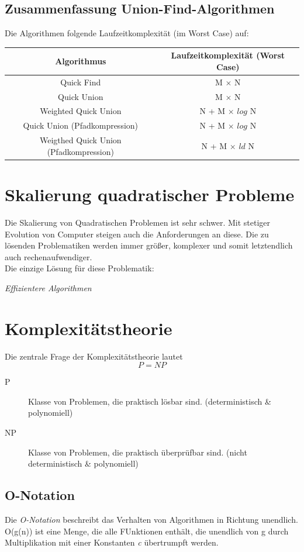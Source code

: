 \documentclass{book}
\begin{document}
\subsection{Zusammenfassung Union-Find-Algorithmen}
Die Algorithmen folgende Laufzeitkomplexität (im Worst Case) auf:
\begin{center}
\begin{tabular}{|c|c|}
	\hline
	\textbf{Algorithmus} & \textbf{Laufzeitkomplexität (Worst Case)} \\
	\hline
	Quick Find & M $\times$ N \\
	Quick Union & M $\times$ N \\
	Weighted Quick Union & N + M $\times$ $log$ N \\
	Quick Union (Pfadkompression) & N + M $\times$ $log$ N \\
	Weigthed Quick Union (Pfadkompression) & N + M $\times$ $ld$ N \\
	\hline
\end{tabular}
\end{center}
\section{Skalierung quadratischer Probleme}
Die Skalierung von Quadratischen Problemen ist sehr schwer. 
Mit stetiger Evolution von Computer steigen auch die Anforderungen an diese.
Die zu lösenden Problematiken werden immer größer, komplexer und somit letztendlich auch rechenaufwendiger.\\
Die einzige Lösung für diese Problematik: 
\begin{center}
	\textit{Effizientere Algorithmen}
\end{center}
\section{Komplexitätstheorie}
Die zentrale Frage der Komplexitätstheorie lautet
$$P = NP$$

\begin{description}
	\item[P] Klasse von Problemen, die praktisch lösbar sind. (deterministisch \& polynomiell)
	\item[NP] Klasse von Problemen, die praktisch überprüfbar sind. (nicht deterministisch \& polynomiell)
\end{description}

\subsection{O-Notation}
Die \textit{O-Notation} beschreibt das Verhalten von Algorithmen in Richtung unendlich. \\
O(g(n)) ist eine Menge, die alle FUnktionen enthält, die unendlich von g durch Multiplikation mit einer Konstanten \textit{c} übertrumpft werden.
\end{document}
